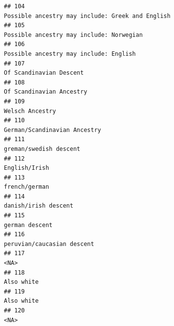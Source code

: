\documentclass[]{article}
\begin{document}
\begin{verbatim}
## 104                                                                                                    Possible ancestry may include: Greek and English
## 105                                                                                                            Possible ancestry may include: Norwegian
## 106                                                                                                              Possible ancestry may include: English
## 107                                                                                                                             Of Scandinavian Descent
## 108                                                                                                                            Of Scandinavian Ancestry
## 109                                                                                                                                     Welsch Ancestry
## 110                                                                                                                        German/Scandinavian Ancestry
## 111                                                                                                                              greman/swedish descent
## 112                                                                                                                                       English/Irish
## 113                                                                                                                                       french/german
## 114                                                                                                                                danish/irish descent
## 115                                                                                                                                      german descent
## 116                                                                                                                          peruvian/caucasian descent
## 117                                                                                                                                                <NA>
## 118                                                                                                                                          Also white
## 119                                                                                                                                          Also white
## 120                                                                                                                                                <NA>

\end{verbatim}
\end{document}
